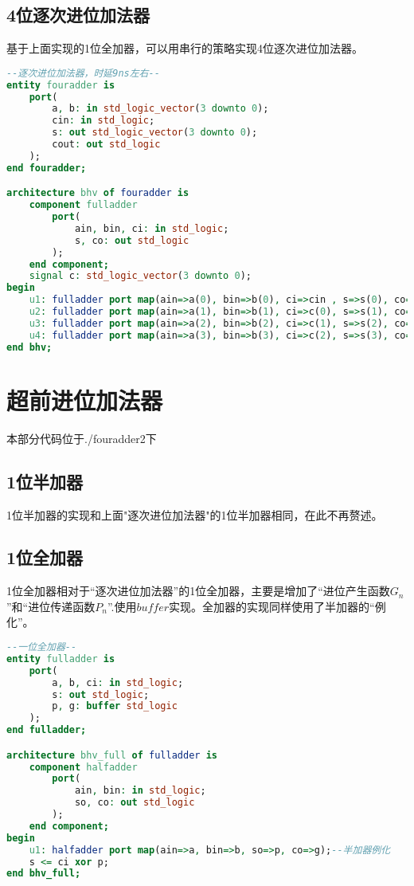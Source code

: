 \documentclass[UTF8, onecolumn, a4paper]{article}
\begin{document}
\subsection{4位逐次进位加法器}
基于上面实现的1位全加器，可以用串行的策略实现4位逐次进位加法器。
\begin{lstlisting}[language={VHDL}, title={fouradder.vhd}]
--逐次进位加法器，时延9ns左右--
entity fouradder is
	port(
		a, b: in std_logic_vector(3 downto 0);
		cin: in std_logic;
		s: out std_logic_vector(3 downto 0);
		cout: out std_logic
	);
end fouradder;

architecture bhv of fouradder is
	component fulladder
		port(
			ain, bin, ci: in std_logic;
			s, co: out std_logic
		);
	end component;
	signal c: std_logic_vector(3 downto 0);
begin
	u1: fulladder port map(ain=>a(0), bin=>b(0), ci=>cin , s=>s(0), co=>c(0) );--元件例化
	u2: fulladder port map(ain=>a(1), bin=>b(1), ci=>c(0), s=>s(1), co=>c(1) );
	u3: fulladder port map(ain=>a(2), bin=>b(2), ci=>c(1), s=>s(2), co=>c(2) );
	u4: fulladder port map(ain=>a(3), bin=>b(3), ci=>c(2), s=>s(3), co=>cout );
end bhv;
\end{lstlisting}

\section{超前进位加法器}
本部分代码位于./fouradder2下
\subsection{1位半加器}
1位半加器的实现和上面"逐次进位加法器"的1位半加器相同，在此不再赘述。
\subsection{1位全加器}
1位全加器相对于“逐次进位加法器”的1位全加器，主要是增加了“进位产生函数$G_n$”和“进位传递函数$P_n$”.使用$buffer$实现。全加器的实现同样使用了半加器的“例化”。
\begin{lstlisting}[language={VHDL}, title={fulladder.vhd}]
--一位全加器--
entity fulladder is
	port(
		a, b, ci: in std_logic;
		s: out std_logic;
		p, g: buffer std_logic
	);
end fulladder;

architecture bhv_full of fulladder is
	component halfadder
		port(
			ain, bin: in std_logic;
			so, co: out std_logic
		);
	end component;
begin
	u1: halfadder port map(ain=>a, bin=>b, so=>p, co=>g);--半加器例化
	s <= ci xor p;
end bhv_full;
\end{lstlisting}
\end{document}
